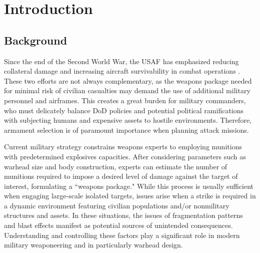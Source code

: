 \chapter{Introduction} \label{chap:1}

\section{Background}

Since the end of the Second World War, the \gls{USAF} has emphasized reducing collateral damage and increasing aircraft survivability in combat operations \cite{SurvivabilityArticle,CollateralDamageNPS}. These two efforts are not always complementary, as the weapons package needed for minimal risk of civilian casualties may demand the use of additional military personnel and airframes. This creates a great burden for military commanders, who must delicately balance \gls{DoD} policies and potential political ramifications with subjecting humans and expensive assets to hostile environments. Therefore, armament selection is of paramount importance when planning attack missions. 

Current military strategy constrains weapons experts to employing munitions with predetermined explosives capacities. After considering parameters such as warhead size and body construction, experts can estimate the number of munitions required to impose a desired level of damage against the target of interest, formulating a ``weapons package." While this process is usually sufficient when engaging large-scale isolated targets, issues arise when a strike is required in a dynamic environment featuring civilian populations and/or nonmilitary structures and assets. In these situations, the issues of fragmentation patterns and blast effects manifest as potential sources of unintended consequences. Understanding and controlling these factors play a significant role in modern military weaponeering and in particularly warhead design. 

